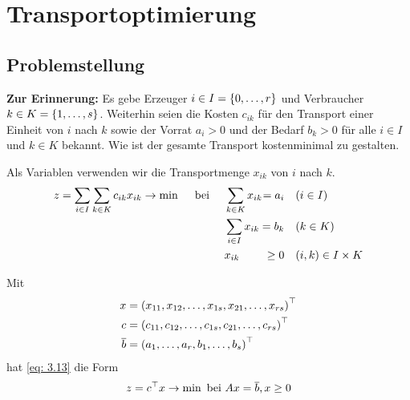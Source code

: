 \section{Transportoptimierung}

\subsection{Problemstellung}

\textbf{Zur Erinnerung:}
Es gebe Erzeuger $i \in I = \left\{ 0, \dots, r \right\}$ und Verbraucher $k \in K = \left\{ 1, \dots, s \right\}$. Weiterhin seien die Kosten $c_{ik}$ für den Transport einer Einheit von $i$ nach $k$ sowie der Vorrat $a_i > 0$ und der Bedarf $b_k > 0$ für alle $i \in I$ und $k \in K$ bekannt. Wie ist der gesamte Transport kostenminimal zu gestalten.

Als Variablen verwenden wir die Transportmenge $x_{ik}$ von $i$ nach $k$.
\begin{equation}
\begin{alignedat}{3}
	z = \sum_{i \in I} \sum_{k \in K} c_{ik} x_{ik} \to \min \quad \text{ bei } \quad 
	&\sum_{k \in K} x_{ik} &= a_i \quad &(i \in I) \\
	&\sum_{i \in I} x_{ik} &= b_k \quad &(k \in K) \\
	& x_{ik} &\ge 0 \quad &(i,k) \in I \times K \\
\end{alignedat}
\label{eq: 3.13}
\end{equation}

Mit   
\begin{equation*}
	\begin{aligned}
		x &= \left( x_{11}, x_{12}, \dots, x_{1s}, x_{21}, \dots, x_{rs} \right)^{\top} \\
		c &= \left( c_{11}, c_{12}, \dots, c_{1s}, c_{21}, \dots, c_{rs} \right)^{\top} \\
		\overline{b} &= \left( a_1, \dots, a_r, b_1, \dots, b_s \right)^{\top}
	\end{aligned}
\end{equation*}
hat \eqref{eq: 3.13} die Form
\begin{equation*}
	z = c^{\top} x \to \min \text{ bei } Ax = \overline{b}, x \ge 0
\end{equation*}